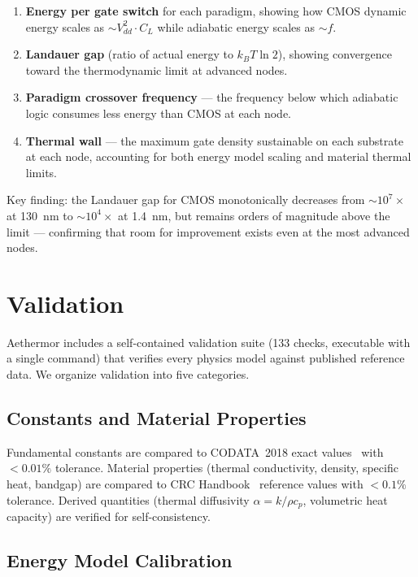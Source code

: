 \documentclass[11pt,twocolumn]{article}
\begin{document}
\begin{enumerate}[nosep]
  \item \textbf{Energy per gate switch} for each paradigm, showing how
    CMOS dynamic energy scales as $\sim V_{dd}^2 \cdot C_L$ while
    adiabatic energy scales as $\sim f$.
  \item \textbf{Landauer gap} (ratio of actual energy to $k_B T \ln 2$),
    showing convergence toward the thermodynamic limit at advanced
    nodes.
  \item \textbf{Paradigm crossover frequency} --- the frequency below
    which adiabatic logic consumes less energy than CMOS at each node.
  \item \textbf{Thermal wall} --- the maximum gate density sustainable
    on each substrate at each node, accounting for both energy model
    scaling and material thermal limits.
\end{enumerate}

Key finding: the Landauer gap for CMOS monotonically decreases from
$\sim 10^7\times$ at 130~nm to $\sim 10^4\times$ at 1.4~nm, but
remains orders of magnitude above the limit --- confirming that room
for improvement exists even at the most advanced nodes.


\section{Validation}
\label{sec:validation}

Aethermor includes a self-contained validation suite (133 checks,
executable with a single command) that verifies every physics model
against published reference data. We organize validation into five
categories.

\subsection{Constants and Material Properties}

Fundamental constants are compared to CODATA~2018 exact
values~\cite{codata2018} with $< 0.01\%$ tolerance. Material properties
(thermal conductivity, density, specific heat, bandgap) are compared to
CRC Handbook~\cite{crc97} reference values with $< 0.1\%$ tolerance.
Derived quantities (thermal diffusivity $\alpha = k / \rho c_p$,
volumetric heat capacity) are verified for self-consistency.

\subsection{Energy Model Calibration}
\end{document}
